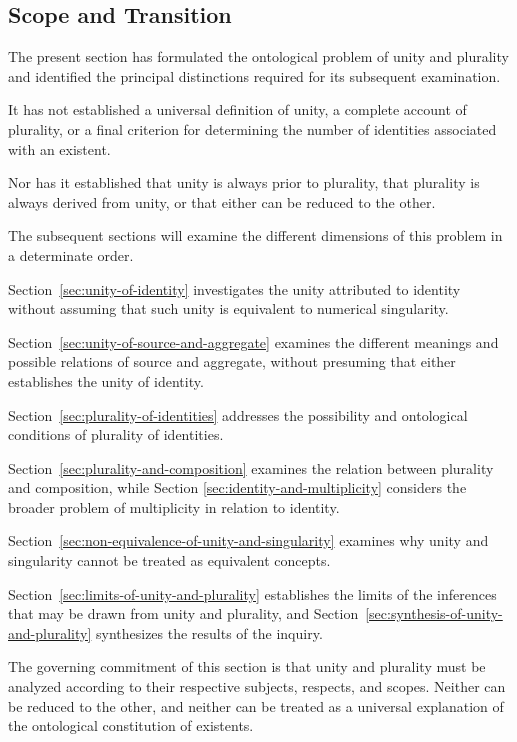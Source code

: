 \subsection{Scope and Transition}

The present section has formulated the ontological
problem of unity and plurality and identified
the principal distinctions required for its
subsequent examination.

It has not established a universal definition
of unity, a complete account of plurality,
or a final criterion for determining the
number of identities associated with an existent.

Nor has it established that unity is always
prior to plurality, that plurality is always
derived from unity, or that either can be
reduced to the other.

The subsequent sections will examine the
different dimensions of this problem in
a determinate order.

Section~\ref{sec:unity-of-identity} investigates
the unity attributed to identity without
assuming that such unity is equivalent
to numerical singularity.

Section~\ref{sec:unity-of-source-and-aggregate}
examines the different meanings and possible
relations of source and aggregate, without
presuming that either establishes the unity
of identity.

Section~\ref{sec:plurality-of-identities}
addresses the possibility and ontological
conditions of plurality of identities.

Section~\ref{sec:plurality-and-composition}
examines the relation between plurality
and composition, while Section
\ref{sec:identity-and-multiplicity}
considers the broader problem of multiplicity
in relation to identity.

Section~\ref{sec:non-equivalence-of-unity-and-singularity}
examines why unity and singularity cannot
be treated as equivalent concepts.

Section~\ref{sec:limits-of-unity-and-plurality}
establishes the limits of the inferences
that may be drawn from unity and plurality,
and Section~\ref{sec:synthesis-of-unity-and-plurality}
synthesizes the results of the inquiry.

The governing commitment of this section
is that unity and plurality must be analyzed
according to their respective subjects,
respects, and scopes. Neither can be reduced
to the other, and neither can be treated
as a universal explanation of the ontological
constitution of existents.

